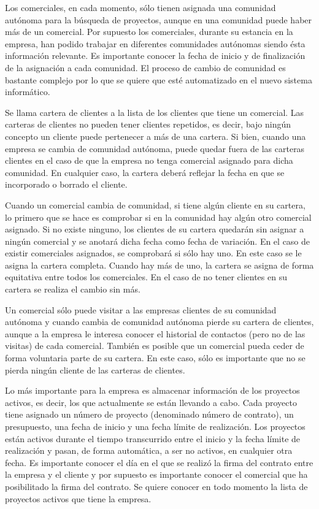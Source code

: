 \documentclass[a4paper]{article}
\begin{document}
Los comerciales, en cada momento, sólo tienen asignada una comunidad autónoma para la búsqueda de proyectos, aunque en una comunidad puede haber más de un comercial. Por supuesto los comerciales, durante su estancia en la empresa, han podido trabajar en diferentes comunidades autónomas siendo ésta información relevante. Es importante conocer la fecha de inicio y de finalización de la asignación a cada comunidad. El proceso de cambio de comunidad es bastante complejo por lo que se quiere que esté automatizado en el nuevo sistema informático.

Se llama cartera de clientes a la lista de los clientes que tiene un comercial. Las carteras de clientes no pueden tener clientes repetidos, es decir, bajo ningún concepto un cliente puede pertenecer a más de una cartera. Si bien, cuando una empresa se cambia de comunidad autónoma, puede quedar fuera de las carteras clientes en el caso de que la empresa no tenga comercial asignado para dicha comunidad. En cualquier caso, la cartera deberá reflejar la fecha en que se incorporado o borrado el cliente.

Cuando un comercial cambia de comunidad, si tiene algún cliente en su cartera, lo primero que se hace es comprobar si en la comunidad hay algún otro comercial asignado. Si no existe ninguno, los clientes de su cartera quedarán sin asignar a ningún comercial y se anotará dicha fecha como fecha de variación. En el caso de existir comerciales asignados, se comprobará si sólo hay uno. En este caso se le asigna la cartera completa. Cuando hay más de uno, la cartera se asigna de forma equitativa entre todos los comerciales. En el caso de no tener clientes en su cartera se realiza el cambio sin más.

Un comercial sólo puede visitar a las empresas clientes de su comunidad autónoma y cuando cambia de comunidad autónoma pierde su cartera de clientes, aunque a la empresa le interesa conocer el historial de contactos (pero no de las visitas) de cada comercial. También es posible que un comercial pueda ceder de forma voluntaria parte de su cartera. En este caso, sólo es importante que no se pierda ningún cliente de las carteras de clientes. 

Lo más importante para la empresa es almacenar información de los proyectos activos, es decir, los que actualmente se están llevando a cabo. Cada proyecto tiene asignado un número de proyecto (denominado número de contrato), un presupuesto, una fecha de inicio y una fecha límite de realización. Los proyectos están activos durante el tiempo transcurrido entre el inicio y la fecha límite de realización y pasan, de forma automática, a ser no activos, en cualquier otra fecha. Es importante conocer el día en el que se realizó la firma del contrato entre la empresa y el cliente y por supuesto es importante conocer el comercial que ha posibilitado la firma del contrato. Se quiere conocer en todo momento la lista de proyectos activos que tiene la empresa.
\end{document}
